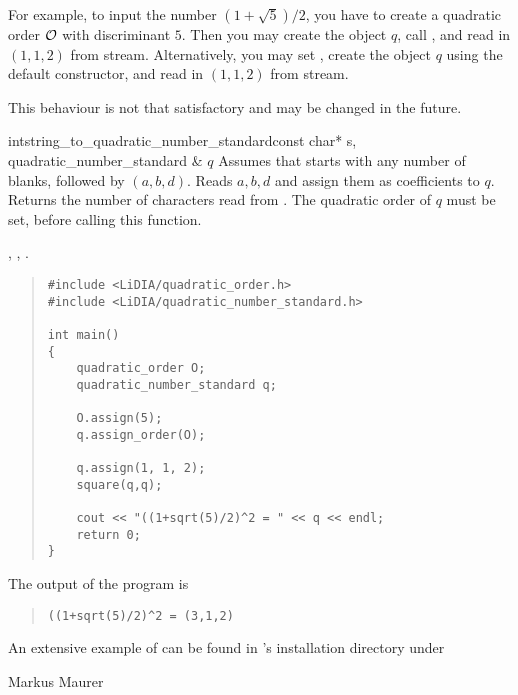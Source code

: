 For example, to input the number $(1 + \sqrt{5})/2$, you have to create a quadratic order $\mathcal{O}$
with discriminant $5$.  Then you may create the  object $q$,
call , and read in $(1,1,2)$ from stream.  Alternatively, you may
set , create the 
object $q$ using the default constructor, and read in $(1,1,2)$ from stream.

This behaviour is not that satisfactory and may be changed in the future.

\begin{fcode}{int}{string_to_quadratic_number_standard}{const char* s, quadratic_number_standard & $q$}
  Assumes that  starts with any number of blanks, followed by $(a,b,d)$.  Reads $a,b,d$
  and assign them as coefficients to $q$.  Returns the number of characters read from .
  The quadratic order of $q$ must be set, before calling this function.
\end{fcode}



\SEEALSO

,
,
.



\EXAMPLES

\begin{quote}
\begin{verbatim}
#include <LiDIA/quadratic_order.h>
#include <LiDIA/quadratic_number_standard.h>

int main()
{
    quadratic_order O;
    quadratic_number_standard q;

    O.assign(5);
    q.assign_order(O);

    q.assign(1, 1, 2);
    square(q,q);

    cout << "((1+sqrt(5)/2)^2 = " << q << endl;
    return 0;
}
\end{verbatim}
\end{quote}

The output of the program is
\begin{quote}
\begin{verbatim}
((1+sqrt(5)/2)^2 = (3,1,2)
\end{verbatim}
\end{quote}

An extensive example of  can be found in \LiDIA's installation
directory under 



\AUTHOR

Markus Maurer

